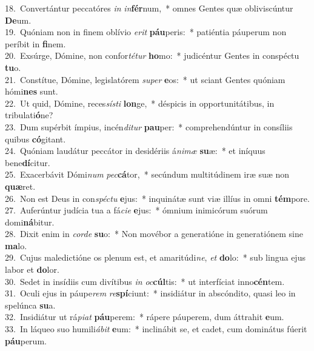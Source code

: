 {18.~}Convertántur peccatóres \textit{in} \textit{in}\textbf{fér}num,~* omnes Gentes quæ obliviscúntur \textbf{De}um.\\
{19.~}Quóniam non in finem oblívio \textit{e}\textit{rit} \textbf{páu}peris:~* patiéntia páuperum non períbit in \textbf{fi}nem.\\
{20.~}Exsúrge, Dómine, non confor\textit{té}\textit{tur} \textbf{ho}mo:~* judicéntur Gentes in conspéctu \textbf{tu}o.\\
{21.~}Constítue, Dómine, legislatórem \textit{su}\textit{per} \textbf{e}os:~* ut sciant Gentes quóniam hómi\textbf{nes} sunt.\\
{22.~}Ut quid, Dómine, reces\textit{sí}\textit{sti} \textbf{lon}ge,~* déspicis in opportunitátibus, in tribulati\textbf{ó}ne?\\
{23.~}Dum supérbit ímpius, incén\textit{di}\textit{tur} \textbf{pau}per:~* comprehendúntur in consíliis quibus \textbf{có}gitant.\\
{24.~}Quóniam laudátur peccátor in desidériis á\textit{ni}\textit{mæ} \textbf{su}æ:~* et iníquus bene\textbf{dí}citur.\\
{25.~}Exacerbávit Dómi\textit{num} \textit{pec}\textbf{cá}tor,~* secúndum multitúdinem iræ suæ non \textbf{quæ}ret.\\
{26.~}Non est Deus in con\textit{spé}\textit{ctu} \textbf{e}jus:~* inquinátæ sunt viæ illíus in omni \textbf{tém}pore.\\
{27.~}Auferúntur judícia tua a fá\textit{ci}\textit{e} \textbf{e}jus:~* ómnium inimicórum suórum domi\textbf{ná}bitur.\\
{28.~}Dixit enim in \textit{cor}\textit{de} \textbf{su}o:~* Non movébor a generatióne in generatiónem sine \textbf{ma}lo.\\
{29.~}Cujus maledictióne os plenum est, et amaritúdi\textit{ne}, \textit{et} \textbf{do}lo:~* sub lingua ejus labor et \textbf{do}lor.\\
{30.~}Sedet in insídiis cum divítibus \textit{in} \textit{oc}\textbf{cúl}tis:~* ut interfíciat inno\textbf{cén}tem.\\
{31.~}Oculi ejus in páupe\textit{rem} \textit{re}\textbf{spí}ciunt:~* insidiátur in abscóndito, quasi leo in spelúnca \textbf{su}a.\\
{32.~}Insidiátur ut rá\textit{pi}\textit{at} \textbf{páu}perem:~* rápere páuperem, dum áttrahit \textbf{e}um.\\
{33.~}In láqueo suo humili\textit{á}\textit{bit} \textbf{e}um:~* inclinábit se, et cadet, cum dominátus fúerit \textbf{páu}perum.\\
